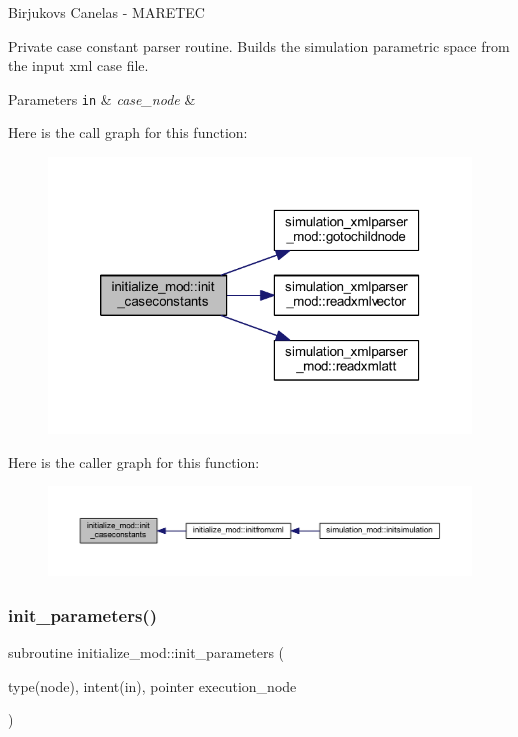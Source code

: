Birjukovs Canelas -\/ M\+A\+R\+E\+T\+EC 

Private case constant parser routine. Builds the simulation parametric space from the input xml case file. 
\begin{DoxyParams}[1]{Parameters}
\mbox{\tt in}  & {\em case\+\_\+node} & \\
\hline
\end{DoxyParams}
Here is the call graph for this function\+:
\nopagebreak
\begin{figure}[H]
\begin{center}
\leavevmode
\includegraphics[width=320pt]{namespaceinitialize__mod_a9d19665b9ac12c3db8b0842bfdb6fa0c_cgraph}
\end{center}
\end{figure}
Here is the caller graph for this function\+:
\nopagebreak
\begin{figure}[H]
\begin{center}
\leavevmode
\includegraphics[width=350pt]{namespaceinitialize__mod_a9d19665b9ac12c3db8b0842bfdb6fa0c_icgraph}
\end{center}
\end{figure}
\mbox{\label{namespaceinitialize__mod_aac9d9dabb797c83e360f9ae60a7e65e3}} 
\subsubsection{\texorpdfstring{init\+\_\+parameters()}{init\_parameters()}}
{\footnotesize\ttfamily subroutine initialize\+\_\+mod\+::init\+\_\+parameters (\begin{DoxyParamCaption}\item[{type(node), intent(in), pointer}]{execution\+\_\+node }\end{DoxyParamCaption})\hspace{0.3cm}{\ttfamily [private]}}



